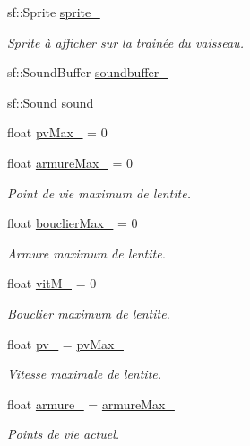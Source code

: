 \begin{DoxyCompactItemize}
sf\+::\+Sprite \hyperlink{class_entite_ab7c03b6fe5c4f1d08cd3e4304e0ef7c0}{sprite\+\_\+}
\begin{DoxyCompactList}\small\item\em Sprite à afficher sur la trainée du vaisseau. \end{DoxyCompactList}\item 
sf\+::\+Sound\+Buffer \hyperlink{class_entite_a065bd31795a4dd6371d3854dd597dfa8}{soundbuffer\+\_\+}
\item 
sf\+::\+Sound \hyperlink{class_entite_ac655768d69b69113f245e5529873cef7}{sound\+\_\+}
\item 
float \hyperlink{class_entite_a1346c3ad97658a42d327ab4928d6639c}{pv\+Max\+\_\+} = 0
\item 
float \hyperlink{class_entite_a2c5851310f0809f805205f23f443a48b}{armure\+Max\+\_\+} = 0
\begin{DoxyCompactList}\small\item\em Point de vie maximum de l\textquotesingle{}entite. \end{DoxyCompactList}\item 
float \hyperlink{class_entite_a7c48bbfd096baadcb84ce62e31e183d9}{bouclier\+Max\+\_\+} = 0
\begin{DoxyCompactList}\small\item\em Armure maximum de l\textquotesingle{}entite. \end{DoxyCompactList}\item 
float \hyperlink{class_entite_ac5f9e68aa96316c6871e1980766977a9}{vit\+M\+\_\+} = 0
\begin{DoxyCompactList}\small\item\em Bouclier maximum de l\textquotesingle{}entite. \end{DoxyCompactList}\item 
float \hyperlink{class_entite_a85b09d98caf443622a546345db8828b8}{pv\+\_\+} = \hyperlink{class_entite_a1346c3ad97658a42d327ab4928d6639c}{pv\+Max\+\_\+}
\begin{DoxyCompactList}\small\item\em Vitesse maximale de l\textquotesingle{}entite. \end{DoxyCompactList}\item 
float \hyperlink{class_entite_a014535fad669c3d890a216f9e8049d09}{armure\+\_\+} = \hyperlink{class_entite_a2c5851310f0809f805205f23f443a48b}{armure\+Max\+\_\+}
\begin{DoxyCompactList}\small\item\em Points de vie actuel. \end{DoxyCompactList}\item 

\end{DoxyCompactItemize}
